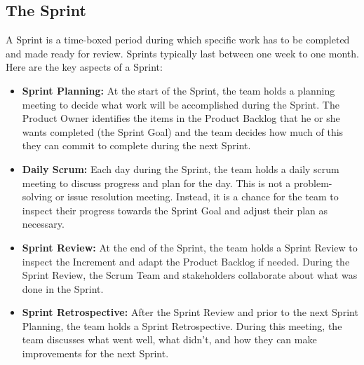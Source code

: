 \subsection{The Sprint}
A Sprint is a time-boxed period during which specific work has to be completed and made ready for review. Sprints typically last between one week to one month. Here are the key aspects of a Sprint:

\vspace{10pt}

\begin{itemize}
\item \textbf{Sprint Planning:} At the start of the Sprint, the team holds a planning meeting to decide what work will be accomplished during the Sprint. The Product Owner identifies the items in the Product Backlog that he or she wants completed (the Sprint Goal) and the team decides how much of this they can commit to complete during the next Sprint.
\item \textbf{Daily Scrum:} Each day during the Sprint, the team holds a daily scrum meeting to discuss progress and plan for the day. This is not a problem-solving or issue resolution meeting. Instead, it is a chance for the team to inspect their progress towards the Sprint Goal and adjust their plan as necessary.
\item \textbf{Sprint Review:} At the end of the Sprint, the team holds a Sprint Review to inspect the Increment and adapt the Product Backlog if needed. During the Sprint Review, the Scrum Team and stakeholders collaborate about what was done in the Sprint.
\item \textbf{Sprint Retrospective:} After the Sprint Review and prior to the next Sprint Planning, the team holds a Sprint Retrospective. During this meeting, the team discusses what went well, what didn't, and how they can make improvements for the next Sprint.
\end{itemize}


